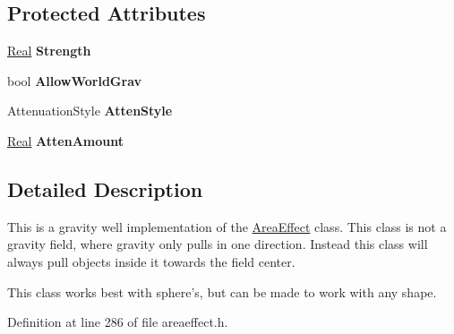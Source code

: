 \subsection*{Protected Attributes}
\begin{DoxyCompactItemize}
\item 
\hypertarget{classphys_1_1GravityWell_acc6e405d39cdc6017040902190e16652}{
\hyperlink{namespacephys_af7eb897198d265b8e868f45240230d5f}{Real} {\bfseries Strength}}
\label{d6/d21/classphys_1_1GravityWell_acc6e405d39cdc6017040902190e16652}

\item 
\hypertarget{classphys_1_1GravityWell_a8b7106e7670a7bc074c245269d211ba0}{
bool {\bfseries AllowWorldGrav}}
\label{d6/d21/classphys_1_1GravityWell_a8b7106e7670a7bc074c245269d211ba0}

\item 
\hypertarget{classphys_1_1GravityWell_a13fda8d3a831a6eba5fd2e03ef2dbcfc}{
AttenuationStyle {\bfseries AttenStyle}}
\label{d6/d21/classphys_1_1GravityWell_a13fda8d3a831a6eba5fd2e03ef2dbcfc}

\item 
\hypertarget{classphys_1_1GravityWell_ad9fd8f2f2dea6a53241ef90852e84503}{
\hyperlink{namespacephys_af7eb897198d265b8e868f45240230d5f}{Real} {\bfseries AttenAmount}}
\label{d6/d21/classphys_1_1GravityWell_ad9fd8f2f2dea6a53241ef90852e84503}

\end{DoxyCompactItemize}


\subsection{Detailed Description}
This is a gravity well implementation of the \hyperlink{classphys_1_1AreaEffect}{AreaEffect} class. This class is not a gravity field, where gravity only pulls in one direction. Instead this class will always pull objects inside it towards the field center. \par
 This class works best with sphere's, but can be made to work with any shape. 

Definition at line 286 of file areaeffect.h.



